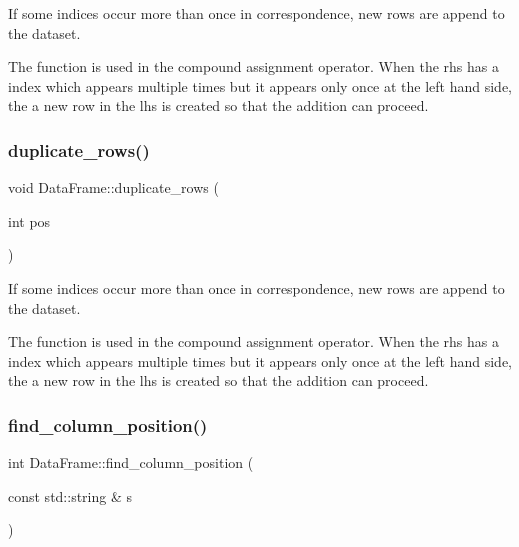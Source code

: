 If some indices occur more than once in correspondence, new rows are append to the dataset. 

The function is used in the compound assignment operator. When the rhs has a index which appears multiple times but it appears only once at the left hand side, the a new row in the lhs is created so that the addition can proceed. \mbox{\label{classDataFrame_ae4b43ae157eb9bba9c85bfc86f4679f7}} 
\subsubsection{\texorpdfstring{duplicate\+\_\+rows()}{duplicate\_rows()}\hspace{0.1cm}{\footnotesize\ttfamily [2/2]}}
{\footnotesize\ttfamily void Data\+Frame\+::duplicate\+\_\+rows (\begin{DoxyParamCaption}\item[{int}]{pos }\end{DoxyParamCaption})\hspace{0.3cm}{\ttfamily [private]}}



If some indices occur more than once in correspondence, new rows are append to the dataset. 

The function is used in the compound assignment operator. When the rhs has a index which appears multiple times but it appears only once at the left hand side, the a new row in the lhs is created so that the addition can proceed. \mbox{\label{classDataFrame_a24a13f1ad2e723ad048e1486d335191a}} 
\subsubsection{\texorpdfstring{find\+\_\+column\+\_\+position()}{find\_column\_position()}}
{\footnotesize\ttfamily int Data\+Frame\+::find\+\_\+column\+\_\+position (\begin{DoxyParamCaption}\item[{const std\+::string \&}]{s }\end{DoxyParamCaption})\hspace{0.3cm}{\ttfamily [private]}}



